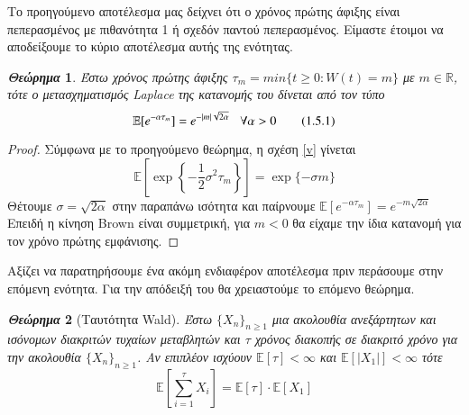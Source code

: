\documentclass[12pt,a4paper,twoside,openany]{book}
\newtheorem{theorem}{\textit{Θεώρημα}}[section]
\begin{document}
		\noindent Το προηγούμενο αποτέλεσμα μας δείχνει ότι ο χρόνος πρώτης άφιξης είναι πεπερασμένος με πιθανότητα 1 ή σχεδόν παντού πεπερασμένος. Είμαστε έτοιμοι να αποδείξουμε το κύριο αποτέλεσμα αυτής της ενότητας.
		\begin{theorem}
			Έστω χρόνος πρώτης άφιξης $\tau_m=min\{t\geq0:W(t)=m\}$ με $m\in\mathbb{R}$, τότε ο μετασχηματισμός Laplace της κατανομής του δίνεται από τον τύπο \[\mathbb{E}[e^{-\alpha\tau_m}]= e^{-|m|\sqrt{2\alpha}}\hspace{3mm} \forall\alpha>0 \label{eq:theorem1.4.6} \tag{1.5.1}\]
		\end{theorem}
		\begin{proof}
			Σύμφωνα με το προηγούμενο θεώρημα, η σχέση \eqref{v} γίνεται 
			\[\mathbb{E}\left[ \exp\left\{-\frac{1}{2}\sigma^2\tau_m\right\}\right] = \exp\{-\sigma m\} \]
			Θέτουμε $\sigma=\sqrt{2\alpha}$ στην παραπάνω ισότητα και παίρνουμε $\mathbb{E}[e^{-\alpha\tau_m}]= e^{-m\sqrt{2\alpha}}$\\ Επειδή η κίνηση Brown είναι συμμετρική, για $m<0$ θα είχαμε την ίδια κατανομή για τον χρόνο πρώτης εμφάνισης.
		\end{proof}
	\vspace{2.5mm}
		\noindent Αξίζει να παρατηρήσουμε ένα ακόμη ενδιαφέρον αποτέλεσμα πριν περάσουμε στην επόμενη ενότητα. Για την απόδειξή του θα χρειαστούμε το επόμενο θεώρημα.
		\begin{theorem}[Ταυτότητα Wald]
			Έστω $\{X_n\}_{n\geq1}$ μια ακολουθία ανεξάρτητων και ισόνομων διακριτών τυχαίων μεταβλητών και $\tau$ χρόνος διακοπής σε διακριτό χρόνο για την ακολουθία $\{X_n\}_{n\geq1}$. Αν επιπλέον ισχύουν $\mathbb{E}[\tau]<\infty$ και $\mathbb{E}[|X_1|]<\infty$ τότε \[\mathbb{E}\left[\sum_{i=1}^{\tau}X_i\right]= \mathbb{E}[\tau]\cdot \mathbb{E}[X_1] \]
		\end{theorem}
	\vspace{2.5mm}
		
\end{document}
